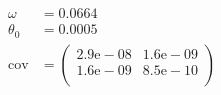 \begin{align}
	\omega &= 0.0664 \\
	\theta_0 &= 0.0005 \\
	\mathrm{cov} &=
	\begin{pmatrix}
		2.9\mathrm{e}-08 &1.6\mathrm{e}-09 \\
		1.6\mathrm{e}-09 &8.5\mathrm{e}-10 \\
	\end{pmatrix} 
\end{align}

